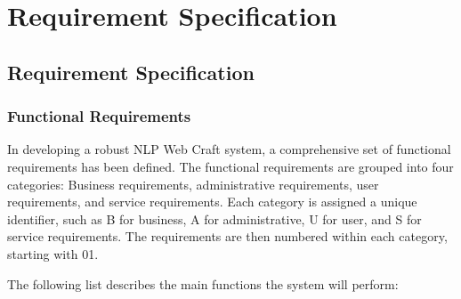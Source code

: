 \documentclass[12pt]{report}
\renewcommand{\headrulewidth}{0pt}
\begin{document}
\listoffigures
\newpage

\listoftables
\newpage
{} %
\renewcommand{\headrulewidth}{0.4pt} %
\chapter{\Huge \bfseries Requirement Specification}

\section{Requirement Specification} %

\subsection{Functional Requirements}

In developing a robust NLP Web Craft system, a comprehensive set of functional requirements has been defined. The functional requirements are grouped into four categories: Business requirements, administrative requirements, user requirements, and service requirements. Each category is assigned a unique identifier, such as B for business, A for administrative, U for user, and S for service requirements. The requirements are then numbered within each category, starting with 01.

The following list describes the main functions the system will perform:
\end{document}
